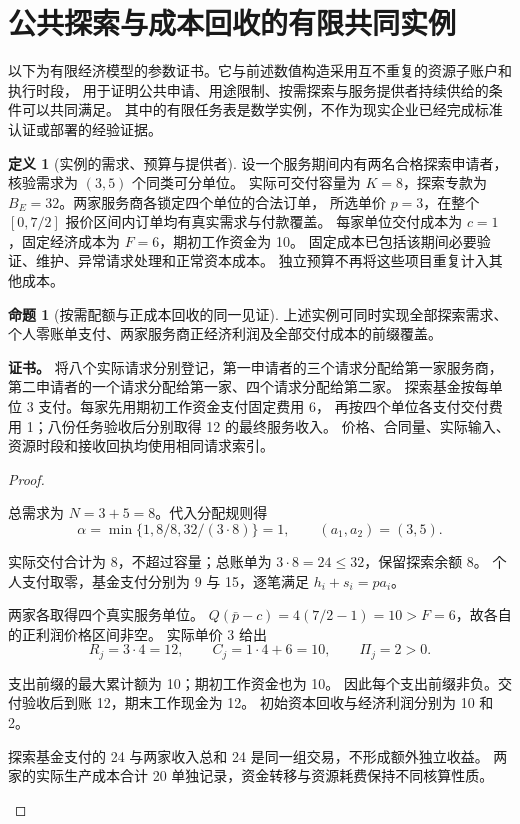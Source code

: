 \documentclass[UTF8,12pt,a4paper,openany,fontset=none,zihao=false]{ctexrep}
\theoremstyle{definition}
\newtheorem{definition}{定义}[chapter]
\newtheorem{proposition}{命题}[chapter]
\newenvironment{certificate}{\par\noindent\textbf{证书。}\ignorespaces}{\par}
\newcommand{\1}{\mathbf 1}
\begin{document}
\section{公共探索与成本回收的有限共同实例}
\label{joint:service-example}

以下为有限经济模型的参数证书。它与前述数值构造采用互不重复的资源子账户和执行时段，
用于证明公共申请、用途限制、按需探索与服务提供者持续供给的条件可以共同满足。
其中的有限任务表是数学实例，不作为现实企业已经完成标准认证或部署的经验证据。

\begin{definition}[实例的需求、预算与提供者]
设一个服务期间内有两名合格探索申请者，核验需求为 \((3,5)\) 个同类可分单位。
实际可交付容量为 \(K=8\)，探索专款为 \(B_E=32\)。两家服务商各锁定四个单位的合法订单，
所选单价 \(p=3\)，在整个 \([0,7/2]\) 报价区间内订单均有真实需求与付款覆盖。
每家单位交付成本为 \(c=1\)，固定经济成本为 \(F=6\)，期初工作资金为 10。
固定成本已包括该期间必要验证、维护、异常请求处理和正常资本成本。
独立预算不再将这些项目重复计入其他成本。
\end{definition}

\begin{proposition}[按需配额与正成本回收的同一见证]
\label{joint:service-numbers}
上述实例可同时实现全部探索需求、个人零账单支付、两家服务商正经济利润及全部交付成本的前缀覆盖。
\end{proposition}
\begin{certificate}
将八个实际请求分别登记，第一申请者的三个请求分配给第一家服务商，
第二申请者的一个请求分配给第一家、四个请求分配给第二家。
探索基金按每单位 3 支付。每家先用期初工作资金支付固定费用 6，
再按四个单位各支付交付费用 1；八份任务验收后分别取得 12 的最终服务收入。
价格、合同量、实际输入、资源时段和接收回执均使用相同请求索引。
\end{certificate}
\begin{proof}
\begin{semanticsteps}
\item 总需求为 \(N=3+5=8\)。代入分配规则得
\[
\alpha=\min\{1,8/8,32/(3\cdot8)\}=1,
\qquad(a_1,a_2)=(3,5).
\]
\item 实际交付合计为 8，不超过容量；总账单为 \(3\cdot8=24\le32\)，保留探索余额 8。
个人支付取零，基金支付分别为 9 与 15，逐笔满足 \(h_i+s_i=pa_i\)。
\item 两家各取得四个真实服务单位。
\(Q(\bar p-c)=4(7/2-1)=10>F=6\)，故各自的正利润价格区间非空。
实际单价 3 给出
\[
R_j=3\cdot4=12,\qquad
C_j=1\cdot4+6=10,\qquad\Pi_j=2>0.
\]
\item 支出前缀的最大累计额为 10；期初工作资金也为 10。
因此每个支出前缀非负。交付验收后到账 12，期末工作现金为 12。
初始资本回收与经济利润分别为 10 和 2。
\item 探索基金支付的 24 与两家收入总和 24 是同一组交易，不形成额外独立收益。
两家的实际生产成本合计 20 单独记录，资金转移与资源耗费保持不同核算性质。
\end{semanticsteps}
\end{proof}
\end{document}
